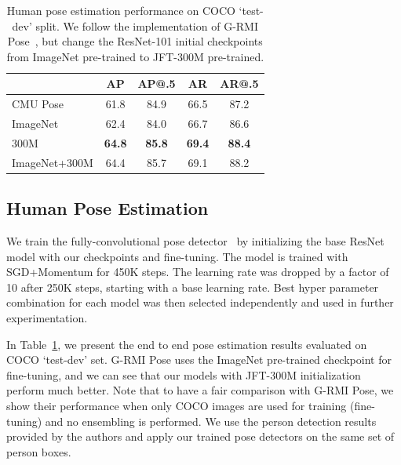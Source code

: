\documentclass[10pt,twocolumn,letterpaper]{article}
\begin{document}
\begin{table}
\center
\begin{tabular}{@{} l | c | c | c | c}
& AP & AP@.5 & AR & AR@.5\\
\hline
CMU Pose~\cite{CMU_Pose} & 61.8 & 84.9 & 66.5 & 87.2 \\
\hline
ImageNet~\cite{papandreou2017towards} & 62.4 & 84.0 & 66.7 & 86.6\\
300M & \bf{64.8} & \bf{85.8} & \bf{69.4} & \bf{88.4} \\
ImageNet+300M & 64.4 & 85.7 & 69.1 & 88.2 \\
\end{tabular}
\vspace{0.1in}
\caption{Human pose estimation performance on COCO `test-dev' split. We follow the implementation of G-RMI Pose~\cite{papandreou2017towards}, but change the ResNet-101 initial checkpoints from ImageNet pre-trained to JFT-300M pre-trained.}
\label{tab:coco_pose}
\end{table}


\subsection{Human Pose Estimation}

We train the fully-convolutional pose detector~\cite{papandreou2017towards} by initializing the base ResNet model with our checkpoints and fine-tuning. The model is trained with SGD+Momentum for 450K steps. The learning rate was dropped by a factor of 10 after 250K steps, starting with a base learning rate. %
Best hyper parameter combination for each model was then selected independently and used in further experimentation.

In Table~\ref{tab:coco_pose}, we present the end to end pose estimation results evaluated on COCO `test-dev' set. G-RMI Pose uses the ImageNet pre-trained checkpoint for fine-tuning, and we can see that our models with JFT-300M initialization perform much better. Note that to have a fair comparison with G-RMI Pose, we show their performance when only COCO images are used for training (fine-tuning) and no ensembling is performed. We use the person detection results provided by the authors and apply our trained pose detectors on the same set of person boxes.
\end{document}
